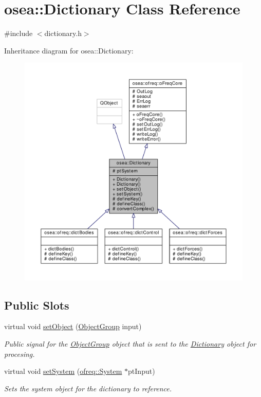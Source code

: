 \hypertarget{classosea_1_1_dictionary}{\section{osea\-:\-:Dictionary Class Reference}
\label{classosea_1_1_dictionary}
}


{\ttfamily \#include $<$dictionary.\-h$>$}



Inheritance diagram for osea\-:\-:Dictionary\-:\nopagebreak
\begin{figure}[H]
\begin{center}
\leavevmode
\includegraphics[width=350pt]{classosea_1_1_dictionary__inherit__graph}
\end{center}
\end{figure}
\subsection*{Public Slots}
\begin{DoxyCompactItemize}
\item 
virtual void \hyperlink{classosea_1_1_dictionary_a900221a385d133644aedcadbae90c2be}{set\-Object} (\hyperlink{classosea_1_1_object_group}{Object\-Group} input)
\begin{DoxyCompactList}\small\item\em Public signal for the \hyperlink{classosea_1_1_object_group}{Object\-Group} object that is sent to the \hyperlink{classosea_1_1_dictionary}{Dictionary} object for procesing. \end{DoxyCompactList}\item 
virtual void \hyperlink{classosea_1_1_dictionary_a4f5b4ce990794a633ff8b69b8c021b66}{set\-System} (\hyperlink{classosea_1_1ofreq_1_1_system}{ofreq\-::\-System} $\ast$pt\-Input)
\begin{DoxyCompactList}\small\item\em Sets the system object for the dictionary to reference. \end{DoxyCompactList}\end{DoxyCompactItemize}
